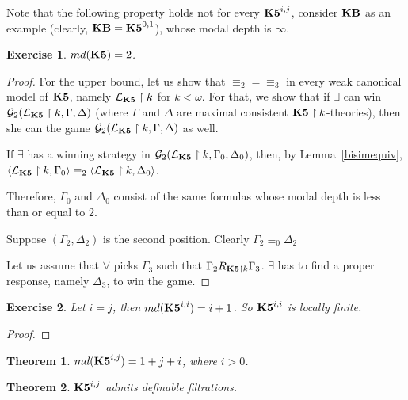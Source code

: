 \documentclass[a4paper]{article}
\theoremstyle{defin}
\theoremstyle{theorem}
\newtheorem{theorem}{Theorem}
\theoremstyle{prop}
\theoremstyle{lemma}
\theoremstyle{fact}
\theoremstyle{exercise}
\newtheorem{exercise}{Exercise}
\theoremstyle{ex}
\theoremstyle{col}
\theoremstyle{claim}
\begin{document}
Note that the following property holds not for every ${\bf K5}^{i,j}$, consider ${\bf KB}$ as an example (clearly, ${\bf KB} = {\bf K5}^{0,1}$), whose modal depth is $\infty$.

\begin{exercise}
$md({\bf K5}) = 2$.
\end{exercise}

\begin{proof}
  For the upper bound, let us show that $\equiv_2 = \equiv_3$ in every weak canonical model of ${\bf K5}$, namely $\mathcal{L}_{\bf K5} \upharpoonright k$ for $k < \omega$.
  For that, we show that if $\exists$ can win $\mathcal{G}_2(\mathcal{L}_{\bf K5} \upharpoonright k, \Gamma, \Delta)$ (where $\Gamma$ and $\Delta$ are maximal consistent ${\bf K5} \upharpoonright k$-theories), then she can the game $\mathcal{G}_2(\mathcal{L}_{\bf K5} \upharpoonright k, \Gamma, \Delta)$ as well.

  If $\exists$ has a winning strategy in $\mathcal{G}_2(\mathcal{L}_{\bf K5} \upharpoonright k, \Gamma_0, \Delta_0)$, then, by Lemma~\ref{bisimequiv}, $\langle \mathcal{L}_{\bf K5} \upharpoonright k, \Gamma_0 \rangle \equiv_2 \langle \mathcal{L}_{\bf K5} \upharpoonright k, \Delta_0 \rangle$.

  Therefore, $\Gamma_0$ and $\Delta_0$ consist of the same formulas whose modal depth is less than or equal to $2$.

  Suppose $(\Gamma_2, \Delta_2)$ is the second position. Clearly $\Gamma_2 \equiv_0 \Delta_2$

  Let us assume that $\forall$ picks $\Gamma_3$ such that $\Gamma_2 R_{{\bf K5} \upharpoonright k} \Gamma_3$. $\exists$ has to find a proper response, namely $\Delta_3$, to win the game.

\end{proof}

\begin{exercise}
  Let $i = j$, then $md({\bf K5}^{i,i}) = i + 1$. So ${\bf K5}^{i,i}$ is locally finite.
\end{exercise}

\begin{proof}

\end{proof}

\begin{theorem}
$md({\bf K5}^{i,j}) = 1 + j + i$, where $i > 0$.
\end{theorem}

\begin{theorem}
  ${\bf K5}^{i,j}$ admits definable filtrations.
\end{theorem}
\end{document}
